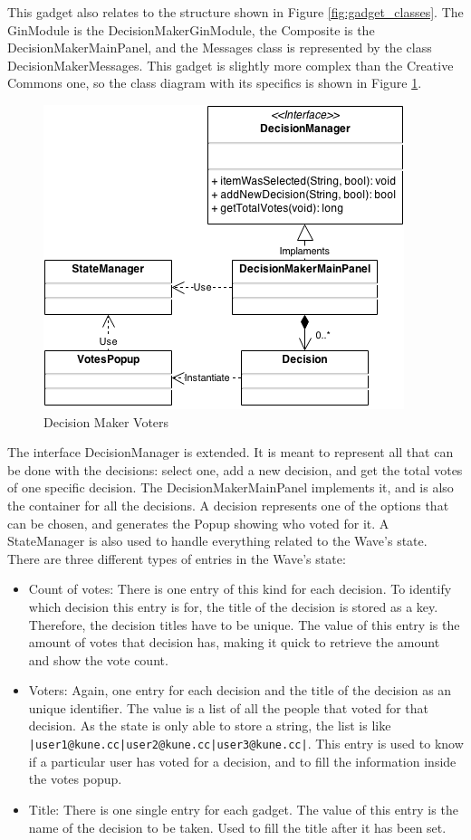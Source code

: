 This gadget also relates to the structure shown in Figure \ref{fig:gadget_classes}. The GinModule is the DecisionMakerGinModule, the Composite is the DecisionMakerMainPanel, and the Messages class is represented by the class DecisionMakerMessages. This gadget is slightly more complex than the Creative Commons one, so the class diagram with its specifics is shown in Figure \ref{fig:decision_maker_diagram}.
\begin{figure}[H]
  \center
    \includegraphics[keepaspectratio, scale=0.5]{Media/Diagrams/Gadget/DecisionMaker.png}
  \caption{Decision Maker Voters}
  \label{fig:decision_maker_diagram}
\end{figure}
The interface DecisionManager is extended. It is meant to represent all that can be done with the decisions: select one, add a new decision, and get the total votes of one specific decision. The DecisionMakerMainPanel implements it, and is also the container for all the decisions. A decision represents one of the options that can be chosen, and generates the Popup showing who voted for it. A StateManager is also used to handle everything related to the Wave's state.\\[.2cm]
There are three different types of entries in the Wave's state:
\begin{itemize}
  \item Count of votes: There is one entry of this kind for each decision. To identify which decision this entry is for, the title of the decision is stored as a key. Therefore, the decision titles have to be unique. The value of this entry is the amount of votes that decision has, making it quick to retrieve the amount and show the vote count.
  \item Voters: Again, one entry for each decision and the title of the decision as an unique identifier. The value is a list of all the people that voted for that decision. As the state is only able to store a string, the list is like \verb+|user1@kune.cc|user2@kune.cc|user3@kune.cc|+. This entry is used to know if a particular user has voted for a decision, and to fill the information inside the votes popup.
  \item Title: There is one single entry for each gadget. The value of this entry is the name of the decision to be taken. Used to fill the title after it has been set.
\end{itemize}

